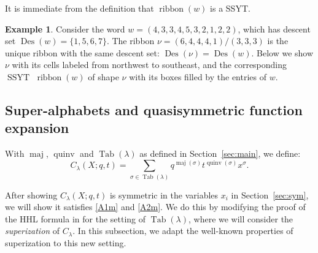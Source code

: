 \documentclass[11pt]{article}
\theoremstyle{definition}
\newtheorem{example}[theo]{Example}
\numberwithin{equation}{section}
\DeclareMathOperator{\PQT}{Tab}
\DeclareMathOperator{\maj}{maj}
\DeclareMathOperator{\Des}{Des}
\DeclareMathOperator{\ribbon}{ribbon}
\DeclareMathOperator{\quinv}{quinv}
\DeclareMathOperator{\SSYT}{SSYT}
\newcommand\cell[3]{
\def\i{#1} \def\j{#2} \def\entry{#3}

\draw (\j-1,-\i)--(\j,-\i)--(\j,-\i+1)--(\j-1,-\i+1)--(\j-1,-\i);
\node at (\j-.5,-\i+.5) {\entry};
}
\begin{document}
It is immediate from the definition that $\ribbon(w)$ is a SSYT. 


\begin{example}
Consider the word $w=(4,3,3,4,5,3,2,1,2,2)$, which has descent set $\Des(w)= \{1,5,6,7\}$. The ribbon $\nu=(6,4,4,4,1)/(3,3,3)$ is the unique ribbon with the same descent set: $\Des(\nu)=\Des(w)$. Below we show $\nu$ with its cells labeled from northwest to southeast, and the corresponding $\SSYT$ $\ribbon(w)$ of shape $\nu$ with its boxes filled by the entries of $w$. 


\begin{center}
\end{center}

\end{example}



\subsection{Super-alphabets and quasisymmetric function expansion}\label{sec:superization}

With $\maj$, $\quinv$  and $\PQT(\lambda)$ as defined in Section~\ref{sec:main}, we define:
\begin{equation}\label{eq:C}
C_{\lambda}(X;q,t) = \sum_{\sigma\in \PQT(\lambda)} q^{\maj(\sigma)} t^{\quinv(\sigma)}x^{\sigma}.
\end{equation} 

After showing $C_{\lambda}(X;q,t)$ is symmetric in the variables $x_i$ in Section~\ref{sec:sym}, we will show it satisfies \eqref{A1m} and \eqref{A2m}. We do this by modifying the proof of the HHL formula in \cite[Section 4]{HHL05} for the setting of $\PQT(\lambda)$, where we will consider the \emph{superization} of $C_{\lambda}$. In this subsection, we adapt the well-known properties of superization to this new setting.
\end{document}
